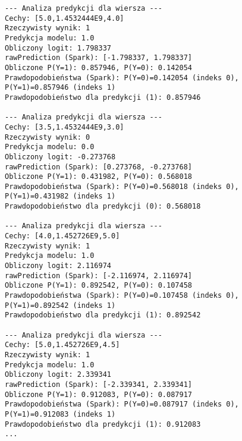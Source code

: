 \documentclass{article}
\begin{document}
\begin{verbatim}
--- Analiza predykcji dla wiersza ---
Cechy: [5.0,1.4532444E9,4.0]
Rzeczywisty wynik: 1
Predykcja modelu: 1.0
Obliczony logit: 1.798337
rawPrediction (Spark): [-1.798337, 1.798337]
Obliczone P(Y=1): 0.857946, P(Y=0): 0.142054
Prawdopodobieństwa (Spark): P(Y=0)=0.142054 (indeks 0), P(Y=1)=0.857946 (indeks 1)
Prawdopodobieństwo dla predykcji (1): 0.857946

--- Analiza predykcji dla wiersza ---
Cechy: [3.5,1.4532444E9,3.0]
Rzeczywisty wynik: 0
Predykcja modelu: 0.0
Obliczony logit: -0.273768
rawPrediction (Spark): [0.273768, -0.273768]
Obliczone P(Y=1): 0.431982, P(Y=0): 0.568018
Prawdopodobieństwa (Spark): P(Y=0)=0.568018 (indeks 0), P(Y=1)=0.431982 (indeks 1)
Prawdopodobieństwo dla predykcji (0): 0.568018

--- Analiza predykcji dla wiersza ---
Cechy: [4.0,1.452726E9,5.0]
Rzeczywisty wynik: 1
Predykcja modelu: 1.0
Obliczony logit: 2.116974
rawPrediction (Spark): [-2.116974, 2.116974]
Obliczone P(Y=1): 0.892542, P(Y=0): 0.107458
Prawdopodobieństwa (Spark): P(Y=0)=0.107458 (indeks 0), P(Y=1)=0.892542 (indeks 1)
Prawdopodobieństwo dla predykcji (1): 0.892542

--- Analiza predykcji dla wiersza ---
Cechy: [5.0,1.452726E9,4.5]
Rzeczywisty wynik: 1
Predykcja modelu: 1.0
Obliczony logit: 2.339341
rawPrediction (Spark): [-2.339341, 2.339341]
Obliczone P(Y=1): 0.912083, P(Y=0): 0.087917
Prawdopodobieństwa (Spark): P(Y=0)=0.087917 (indeks 0), P(Y=1)=0.912083 (indeks 1)
Prawdopodobieństwo dla predykcji (1): 0.912083
...
\end{verbatim}
\end{document}
